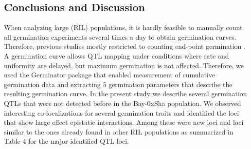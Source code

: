 \subsection{Conclusions and Discussion}
When analyzing large (RIL) populations, it is hardly feasible to manually count all germination 
experiments several times a day to obtain germination curves. Therefore, previous studies mostly 
restricted to counting end-point germination \cite{Quesada:2002, Alonso-Blanco:2003, Clerkx:2004, 
Laserna:2008, Meng:2008, Bentsink:2010, Galpaz:2010, Vallejo:2010}. A germination curve allows QTL 
mapping under conditions where rate and uniformity are delayed, but maximum germination is not 
affected. Therefore, we used the Germinator package \cite{Joosen:2010} that enabled measurement 
of cumulative germination data and extracting 5 germination parameters that describe the resulting 
germination curve. In the present study we describe several germination QTLs that were not detected 
before in the Bay-0xSha population. We observed interesting co-localizations for several germination 
traits and identified the loci that show large effect epistatic interactions. Among these were new 
loci and loci similar to the ones already found in other RIL populations as summarized in Table 4 for 
the major identified QTL loci.

